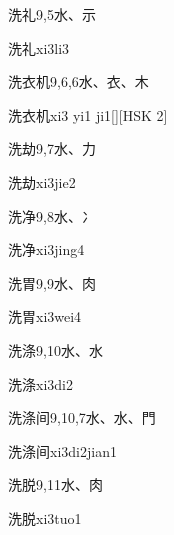 \begin{entry}{洗礼}{9,5}{⽔、⽰}
  \begin{phonetics}{洗礼}{xi3li3}
  \end{phonetics}
\end{entry}

\begin{entry}{洗衣机}{9,6,6}{⽔、⾐、⽊}
  \begin{phonetics}{洗衣机}{xi3 yi1 ji1}[][HSK 2]
  \end{phonetics}
\end{entry}

\begin{entry}{洗劫}{9,7}{⽔、⼒}
  \begin{phonetics}{洗劫}{xi3jie2}
  \end{phonetics}
\end{entry}

\begin{entry}{洗净}{9,8}{⽔、⼎}
  \begin{phonetics}{洗净}{xi3jing4}
  \end{phonetics}
\end{entry}

\begin{entry}{洗胃}{9,9}{⽔、⾁}
  \begin{phonetics}{洗胃}{xi3wei4}
  \end{phonetics}
\end{entry}

\begin{entry}{洗涤}{9,10}{⽔、⽔}
  \begin{phonetics}{洗涤}{xi3di2}
  \end{phonetics}
\end{entry}

\begin{entry}{洗涤间}{9,10,7}{⽔、⽔、⾨}
  \begin{phonetics}{洗涤间}{xi3di2jian1}
  \end{phonetics}
\end{entry}

\begin{entry}{洗脱}{9,11}{⽔、⾁}
  \begin{phonetics}{洗脱}{xi3tuo1}
  \end{phonetics}
\end{entry}


